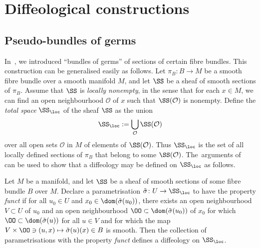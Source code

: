 \section{Diffeological constructions}\label{sec3}

\subsection{Pseudo-bundles of germs}\label{pseudobundlesofgerms}

In~\cite{mac3}, we introduced ``bundles of germs'' of sections of certain fibre bundles. This construction can be generalised easily as follows. Let $\pi_{B}\colon B\rightarrow M$ be a smooth fibre bundle over a smooth manifold $M$, and let $\SS$ be a sheaf of smooth sections of $\pi_{B}$. Assume that $\SS$ is \textit{locally nonempty}, in the sense that for each $x\in M$, we can find an open neighbourhood $\mathcal{O}$ of $x$ such that $\SS(\mathcal{O})$ is nonempty. Define the \textit{total space} $\SS_{\loc}$ of the sheaf $\SS$ as the union
\begin{gather*}
\SS_{\loc}:=\bigcup_{\mathcal{O}}\SS(\mathcal{O})
\end{gather*}
over all open sets $\mathcal{O}$ in $M$ of elements of $\SS(\mathcal{O})$. Thus $\SS_{\loc}$ is the set of all locally defined sections of $\pi_{B}$ that belong to some $\SS(\mathcal{O})$. The~arguments of~\cite[Section~1.63]{diffeology} can be used to show that a diffeology may be defined on $\SS_{\loc}$ as follows.

\begin{Proposition}\label{functprop}
Let $M$ be a manifold, and let $\SS$ be a sheaf of smooth sections of some fibre bundle $B$ over $M$. Declare a parametrisation $\tilde{\sigma}\colon U\rightarrow \SS_{\loc}$ to have the property \textit{funct} if for all $u_{0}\in U$ and $x_{0}\in\dom(\tilde{\sigma}(u_{0}))$, there exists an open neighbourhood $V\subset U$ of $u_{0}$ and an open neighbourhood $\OO\subset \dom(\tilde{\sigma}(u_{0}))$ of $x_{0}$ for which $\OO\subset\dom(\tilde{\sigma}(u))$ for all $u\in V$ and for which the map $V\times\OO\ni(u,x)\mapsto\tilde{\sigma}(u)(x)\in B$ is smooth. Then the collection of parametrisations with the property \textit{funct} defines a diffeology on $\SS_{\loc}$.
\end{Proposition}

